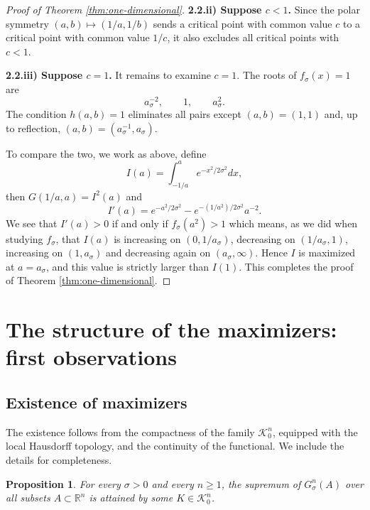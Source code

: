 \documentclass[12pt,oneside,reqno]{amsart}
\numberwithin{equation}{section}
\newtheorem{proposition}[theorem]{Proposition}
\theoremstyle{remark}
\newcommand{\R}{\mathbb R}
\def\s{\sigma}
\def\class{\mathcal{K}^n_0}
\begin{document}
\begin{proof}[Proof of Theorem \ref{thm:one-dimensional}]
{\bf 2.2.ii) Suppose $c<1$. }  Since the polar symmetry $(a,b)\mapsto(1/a,1/b)$ sends a critical point with common value $c$ to a critical point with common value $1/c$, it also excludes all critical points with $c<1$.

 
{\bf 2.2.iii) Suppose $c=1$.} It remains to examine $c=1$. The roots of $f_\sigma(x)=1$ are
\[
        a_\sigma^{-2},\qquad 1,
        \qquad a_\sigma^2.
\]
The condition $h(a,b)=1$ eliminates all pairs except $(a,b)=(1,1)$ and, up to reflection, $(a,b)=(a_\sigma^{-1},a_\sigma)$.

 To compare the two, we work as above, define 
\[ I(a) = \int_{-1/a}^a e^{-x^2/2\sigma^2}dx,\]
then $G(1/a,a)=I^2(a)$ and
\[ I'(a) = e^{-a^2/2\sigma^2}  - e^{-(1/a^2)/2\sigma^2}a^{-2}.\]
We see that $I'(a)>0$ if and only if $f_\s(a^2)>1$ which means, as we did when studying $f_\s$, that $I(a)$ is increasing on $(0,1/a_\sigma)$, decreasing on $(1/a_\sigma, 1)$, increasing on $(1,a_\sigma)$ and decreasing again on $(a_\s, \infty)$. Hence $I$ is maximized at $a=a_\sigma$, and this value is strictly larger than $I(1)$. This completes the proof of Theorem \ref{thm:one-dimensional}. \end{proof}


\section{The structure of the maximizers: first observations}

\subsection{Existence of maximizers}\label{sec:existence}
The existence follows from the compactness of the family $\class$,
equipped with the local Hausdorff topology, and the continuity of the
functional. We include the details for completeness.
 

\begin{proposition}\label{prop:existence}
For every $\sigma>0$ and every $n\ge1$, the supremum of $G^n_\sigma(A)$ over all subsets $A\subset\R^n$ is attained by some $K\in \class$.
\end{proposition}
\end{document}
